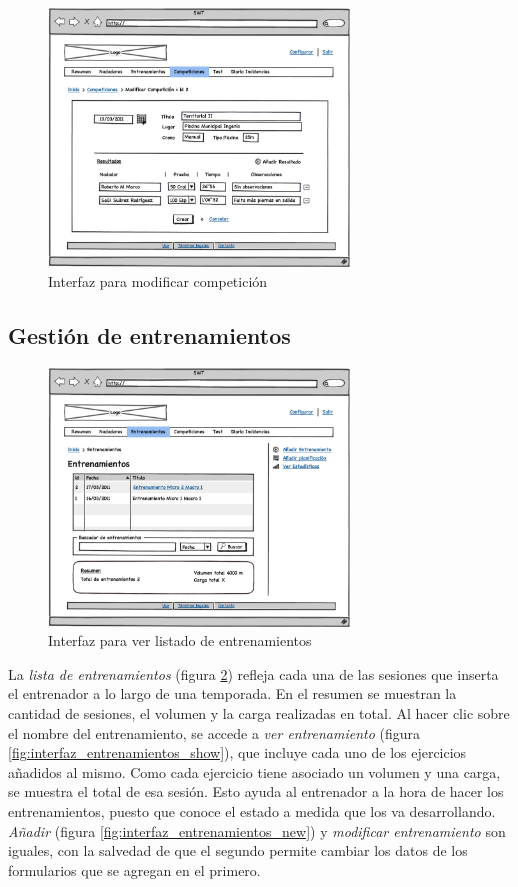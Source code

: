		\begin{figure}[H]
		  \centering
		    \includegraphics[width=8cm]{./eps/p_interfaz/17_Competiciones_modif.eps}
		  \caption{Interfaz para modificar competición}
		  \label{fig:interfaz_competiciones_modif}
		\end{figure}
	
	\subsection{Gestión de entrenamientos} %
		\label{sub:gestion_de_entrenamientos}
	
		\begin{figure}[H]
		  \centering
		    \includegraphics[width=8cm]{./eps/p_interfaz/18_Entrenamientos.eps}
		  \caption{Interfaz para ver listado de entrenamientos}
		  \label{fig:interfaz_entrenamientos}
		\end{figure}
		
	La {\it lista de entrenamientos} (figura \ref{fig:interfaz_entrenamientos}) refleja cada una de las sesiones que inserta el entrenador a lo largo de una temporada. En el resumen se muestran la cantidad de sesiones, el volumen y la carga realizadas en total. Al hacer clic sobre el nombre del entrenamiento, se accede a {\it ver entrenamiento} (figura \ref{fig:interfaz_entrenamientos_show}), que incluye cada uno de los ejercicios añadidos al mismo. Como cada ejercicio tiene asociado un volumen y una carga, se muestra el total de esa sesión. Esto ayuda al entrenador a la hora de hacer los entrenamientos, puesto que conoce el estado a medida que los va desarrollando.\\
	\newline
	{\it Añadir} (figura \ref{fig:interfaz_entrenamientos_new}) y {\it modificar entrenamiento} son iguales, con la salvedad de que el segundo permite cambiar los datos de los formularios que se agregan en el primero.

